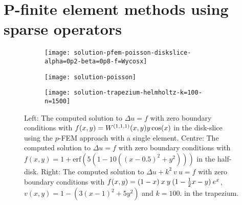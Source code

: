%


\section{P-finite element methods using sparse operators}\label{section:ds:PFEM}

\begin{figure}[t]
	\begin{subfigure}{0.3\textwidth}
	\texttt{[image: solution-pfem-poisson-diskslice-alpha=0p2-beta=0p8-f=Wycosx]}
	\centering
	\end{subfigure}
	\begin{subfigure}{0.3\textwidth}
	\texttt{[image: solution-poisson]}
	\centering
	\end{subfigure}
	\begin{subfigure}{0.3\textwidth}
	\texttt{[image: solution-trapezium-helmholtz-k=100-n=1500]}
	\centering
	\end{subfigure}
	\centering
	\caption{Left: The computed solution to $\Delta u = f$ with zero boundary conditions with $f(x,y) = W^{(1,1,1)}(x,y) y \cos(x)$ in the disk-slice using the $p$-FEM approach with a single element. Centre: The computed solution to $\Delta u = f$ with zero boundary conditions with $f(x,y) = 1 + \text{erf}(5(1 - 10((x - 0.5)^2 + y^2)))$ in the half-disk. Right: The computed solution to $\Delta u + k^2 \: v \: u = f$ with zero boundary conditions with $f(x,y) = (1-x) \: x \: y \: (1- \frac{1}{2} x - y) \: e^x$, $v(x,y) = 1 - (3(x-1)^2 + 5y^2)$ and $k = 100$. in the trapezium.}
	\centering
	\label{fig:ds:trappfem}
\end{figure}

